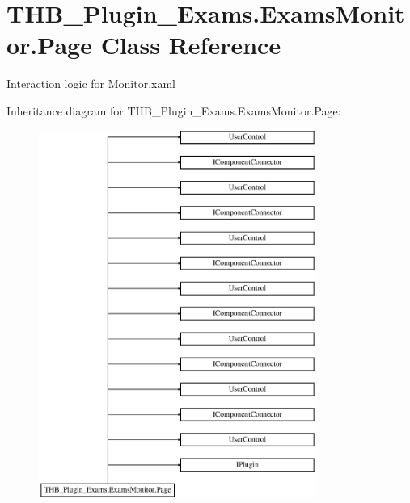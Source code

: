 \hypertarget{class_t_h_b___plugin___exams_1_1_exams_monitor_1_1_page}{}\section{T\+H\+B\+\_\+\+Plugin\+\_\+\+Exams.\+Exams\+Monitor.\+Page Class Reference}
\label{class_t_h_b___plugin___exams_1_1_exams_monitor_1_1_page}


Interaction logic for Monitor.\+xaml  


Inheritance diagram for T\+H\+B\+\_\+\+Plugin\+\_\+\+Exams.\+Exams\+Monitor.\+Page\+:\begin{figure}[H]
\begin{center}
\leavevmode
\includegraphics[height=12.000000cm]{d0/d6b/class_t_h_b___plugin___exams_1_1_exams_monitor_1_1_page}
\end{center}
\end{figure}
